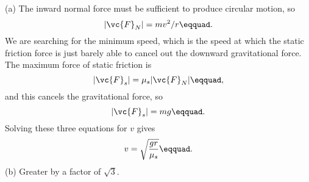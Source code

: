 (a) The inward normal force must be sufficient to
produce circular motion, so
\begin{equation*}
        |\vc{F}_N|     =  mv ^2/ r\eqquad.
\end{equation*}
We are searching for the minimum speed, which is the speed
at which the static friction force is just barely able to
cancel out the downward gravitational force. The maximum
force of static friction is
\begin{equation*}
        |\vc{F}_s|     =  \mu_s |\vc{F}_N|\eqquad,
\end{equation*}
and this cancels the gravitational force, so
\begin{equation*}
        |\vc{F}_s|     =  mg\eqquad.
\end{equation*}
Solving these three equations for $v$ gives
\begin{equation*}
        v     = \sqrt{\frac{gr}{\mu_s}}\eqquad.
\end{equation*}
(b) Greater by a factor of $\sqrt{3}$.



